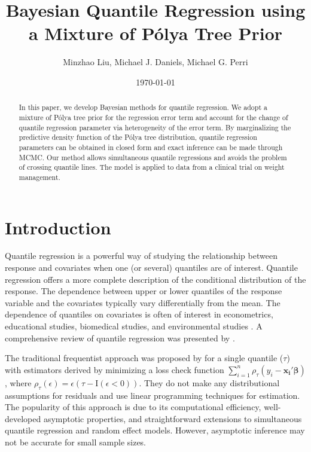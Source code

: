 \documentclass[12pt]{article}
\title{Bayesian Quantile Regression using a  Mixture of P\'{o}lya Tree Prior}
\date{\today}
\author{Minzhao Liu, Michael J. Daniels, Michael G. Perri}
\newcommand{\polya}{P\'{o}lya}
\begin{document}

\maketitle{}

\begin{abstract}
In this paper, we develop Bayesian methods for quantile regression.
We adopt a mixture of \polya{} tree prior for the regression error term
and account for the change of quantile regression parameter via heterogeneity of the error term.
By marginalizing the predictive density function of the \polya{} tree distribution,
quantile regression parameters can be obtained in closed form and exact inference can be made through MCMC.
Our method allows simultaneous quantile regressions and avoids the problem of crossing quantile lines.
The model is applied to data from a clinical trial on weight management.
\end{abstract}

\section{Introduction}

Quantile regression is a powerful way of studying the relationship
between response and covariates when one (or several) quantiles are of
interest.
Quantile regression offers a more complete description of the
conditional distribution of the response.
The dependence between upper or lower quantiles of the
response variable and the covariates typically vary
differentially from the mean. The dependence of quantiles on covariates is often of
interest in econometrics, educational studies, biomedical studies, and
environmental studies \citep{yu2001,buchinsky1994,
  buchinsky1998,he1998,koenker1999, wei2006, yu2003}.  A comprehensive
review of quantile regression was presented by \citet{koenker2005}.

The traditional frequentist approach was proposed by
\citet{koenker1978} for a single quantile ($\tau$) with estimators
derived by minimizing a loss check function $\sum_{i=1}^n
\rho_{\tau}(y_i - \bm{x_i\prime\beta})$, where $\rho_{\tau}(\epsilon) =
\epsilon (\tau- \mathrm{I}(\epsilon < 0))$. They do not make any
distributional assumptions for residuals and use linear programming
techniques for estimation.  The popularity of this approach is due to
its computational efficiency, well-developed asymptotic properties,
and straightforward extensions to simultaneous quantile regression and
random effect models. However, asymptotic inference may not be
accurate for small sample sizes.
\end{document}
